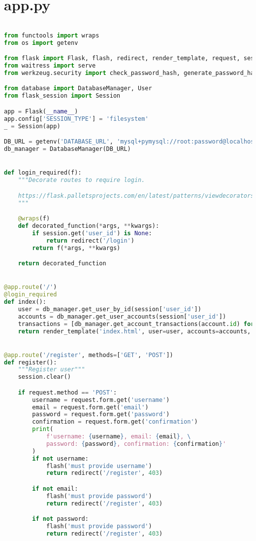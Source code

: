 \section{app.py}
\begin{lstlisting}[language=Python]

from functools import wraps
from os import getenv

from flask import Flask, flash, redirect, render_template, request, session, url_for
from waitress import serve
from werkzeug.security import check_password_hash, generate_password_hash

from database import DatabaseManager, User
from flask_session import Session

app = Flask(__name__)
app.config['SESSION_TYPE'] = 'filesystem'
_ = Session(app)

DB_URL = getenv('DATABASE_URL', 'mysql+pymysql://root:password@localhost/flask_ebank')
db_manager = DatabaseManager(DB_URL)


def login_required(f):
	"""Decorate routes to require login.

	https://flask.palletsprojects.com/en/latest/patterns/viewdecorators/
	"""

	@wraps(f)
	def decorated_function(*args, **kwargs):
		if session.get('user_id') is None:
			return redirect('/login')
		return f(*args, **kwargs)

	return decorated_function


@app.route('/')
@login_required
def index():
	user = db_manager.get_user_by_id(session['user_id'])
	accounts = db_manager.get_user_accounts(session['user_id'])
	transactions = [db_manager.get_account_transactions(account.id) for account in accounts]
	return render_template('index.html', user=user, accounts=accounts, transactions=transactions)


@app.route('/register', methods=['GET', 'POST'])
def register():
	"""Register user"""
	session.clear()

	if request.method == 'POST':
		username = request.form.get('username')
		email = request.form.get('email')
		password = request.form.get('password')
		confirmation = request.form.get('confirmation')
		print(
			f'username: {username}, email: {email}, \
			password: {password}, confirmation: {confirmation}'
		)
		if not username:
			flash('must provide username')
			return redirect('/register', 403)

		if not email:
			flash('must provide password')
			return redirect('/register', 403)

		if not password:
			flash('must provide password')
			return redirect('/register', 403)


\end{lstlisting}
